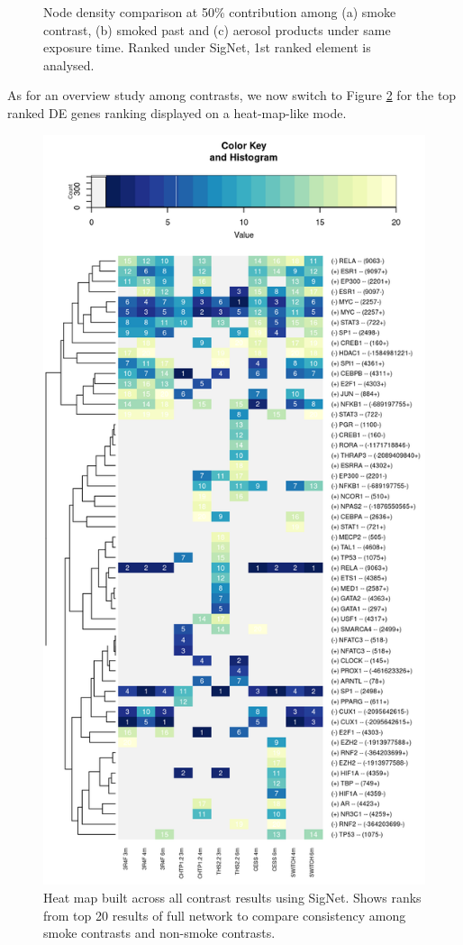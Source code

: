 \begin{figure}
    \caption{Node density comparison at 50\% contribution among (a) smoke contrast, (b) smoked past and (c) aerosol products under same exposure time. Ranked under SigNet, 1st ranked element is analysed.}
    \label{fig:compare-density}
\end{figure}

As for an overview study among contrasts, we now switch to Figure \ref{fig:heatmap-overview} for the top ranked DE genes ranking displayed on a heat-map-like mode.

\begin{figure}
    \centering
    \includegraphics[width=\textwidth, height=\textheight, keepaspectratio]{Major Thesis/figures/iut/heat/heatmap-contrasts.png}
    \caption{Heat map built across all contrast results using SigNet. Shows ranks from top 20 results of full network to compare consistency among smoke contrasts and non-smoke contrasts.}
    \label{fig:heatmap-overview}
\end{figure}

